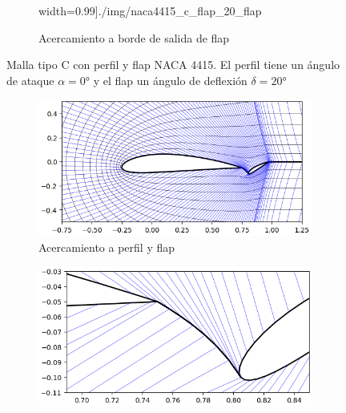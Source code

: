 \documentclass[letterpaper, openright, 12pt]{book}
\begin{document}
\begin{figure}[htbp!]
\begin{subfigure}[c]{0.45\textwidth}
                width=0.99\textwidth]{./img/naca4415_c_flap_20_flap}
            \caption{Acercamiento a borde de salida de flap}
            \label{fig:naca4415_c_flap_20_flap}
        \end{subfigure}
        \caption[Malla tipo C con perfil y flap NACA 4415 a
            $20\si{\degree}$]{Malla tipo C con perfil y flap NACA 4415. El
            perfil tiene un ángulo de ataque $\alpha = 0\si{\degree}$ y el flap
            un ángulo de deflexión $\delta = 20\si{\degree}$}
        \label{fig:naca4415_c_flap_20_}
    \end{figure}

    \begin{figure}[htbp!]
        \centering
        \begin{subfigure}[c]{0.45\textwidth}
            \includegraphics[keepaspectratio,
                width=0.99\textwidth]{./img/naca4415_c_flap_-30}
            \caption{Acercamiento a perfil y flap}
            \label{fig:naca4415_c_flap_-30}
        \end{subfigure}
        \hfill
        \begin{subfigure}[c]{0.45\textwidth}
            \includegraphics[keepaspectratio,
                width=0.99\textwidth]{./img/naca4415_c_flap_-30_both}

\end{subfigure}
\end{figure}
\end{document}
